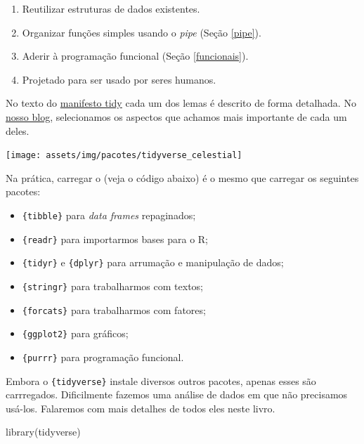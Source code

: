 \documentclass[
]{book}
\newenvironment{Shaded}{\begin{snugshade}}{\end{snugshade}}
\newcommand{\FunctionTok}[1]{\textcolor[rgb]{0.00,0.00,0.00}{#1}}
\newcommand{\NormalTok}[1]{#1}
\providecommand{\tightlist}{%
  \setlength{\itemsep}{0pt}\setlength{\parskip}{0pt}}
\begin{document}
\begin{enumerate}
\def\labelenumi{\arabic{enumi}.}
\tightlist
\item
  Reutilizar estruturas de dados existentes.
\item
  Organizar funções simples usando o \emph{pipe} (Seção \ref{pipe}).
\item
  Aderir à programação funcional (Seção \ref{funcionais}).
\item
  Projetado para ser usado por seres humanos.
\end{enumerate}

No texto do \href{https://cran.r-project.org/web/packages/tidyverse/vignettes/manifesto.html}{manifesto tidy} cada um dos lemas é descrito de forma detalhada. No \href{https://www.curso-r.com/blog/2017-02-16-manifesto-tidy/}{nosso blog}, selecionamos os aspectos que achamos mais importante de cada um deles.

\begin{center}\texttt{[image: assets/img/pacotes/tidyverse\_celestial]} \end{center}

Na prática, carregar o (veja o código abaixo) é o mesmo que carregar os seguintes pacotes:

\begin{itemize}
\item
  \texttt{\{tibble\}} para \emph{data frames} repaginados;
\item
  \texttt{\{readr\}} para importarmos bases para o R;
\item
  \texttt{\{tidyr\}} e \texttt{\{dplyr\}} para arrumação e manipulação de dados;
\item
  \texttt{\{stringr\}} para trabalharmos com textos;
\item
  \texttt{\{forcats\}} para trabalharmos com fatores;
\item
  \texttt{\{ggplot2\}} para gráficos;
\item
  \texttt{\{purrr\}} para programação funcional.
\end{itemize}

Embora o \texttt{\{tidyverse\}} instale diversos outros pacotes, apenas esses são carrregados. Dificilmente fazemos uma análise de dados em que não precisamos usá-los. Falaremos com mais detalhes de todos eles neste livro.

\begin{Shaded}
\begin{Highlighting}[]
\FunctionTok{library}\NormalTok{(tidyverse)}
\end{Highlighting}
\end{Shaded}
\end{document}

